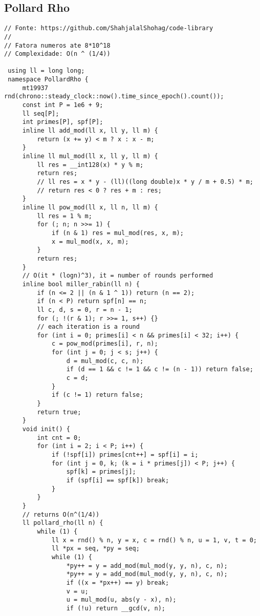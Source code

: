 \documentclass[11pt, a4paper, twoside]{article}
\begin{document}
\subsection{Pollard Rho}
\begin{lstlisting}
// Fonte: https://github.com/ShahjalalShohag/code-library
// 
// Fatora numeros ate 8*10^18 
// Complexidade: O(n ^ (1/4))

 using ll = long long;
 namespace PollardRho {
     mt19937 rnd(chrono::steady_clock::now().time_since_epoch().count());
     const int P = 1e6 + 9;
     ll seq[P];
     int primes[P], spf[P];
     inline ll add_mod(ll x, ll y, ll m) {
         return (x += y) < m ? x : x - m;
     }
     inline ll mul_mod(ll x, ll y, ll m) {
         ll res = __int128(x) * y % m;
         return res;
         // ll res = x * y - (ll)((long double)x * y / m + 0.5) * m;
         // return res < 0 ? res + m : res;
     }
     inline ll pow_mod(ll x, ll n, ll m) {
         ll res = 1 % m;
         for (; n; n >>= 1) {
             if (n & 1) res = mul_mod(res, x, m);
             x = mul_mod(x, x, m);
         }
         return res;
     }
     // O(it * (logn)^3), it = number of rounds performed
     inline bool miller_rabin(ll n) {
         if (n <= 2 || (n & 1 ^ 1)) return (n == 2);
         if (n < P) return spf[n] == n;
         ll c, d, s = 0, r = n - 1;
         for (; !(r & 1); r >>= 1, s++) {}
         // each iteration is a round
         for (int i = 0; primes[i] < n && primes[i] < 32; i++) {
             c = pow_mod(primes[i], r, n);
             for (int j = 0; j < s; j++) {
                 d = mul_mod(c, c, n);
                 if (d == 1 && c != 1 && c != (n - 1)) return false;
                 c = d;
             }
             if (c != 1) return false;
         }
         return true;
     }
     void init() {
         int cnt = 0;
         for (int i = 2; i < P; i++) {
             if (!spf[i]) primes[cnt++] = spf[i] = i;
             for (int j = 0, k; (k = i * primes[j]) < P; j++) {
                 spf[k] = primes[j];
                 if (spf[i] == spf[k]) break;
             }
         }
     }
     // returns O(n^(1/4))
     ll pollard_rho(ll n) {
         while (1) {
             ll x = rnd() % n, y = x, c = rnd() % n, u = 1, v, t = 0;
             ll *px = seq, *py = seq;
             while (1) {
                 *py++ = y = add_mod(mul_mod(y, y, n), c, n);
                 *py++ = y = add_mod(mul_mod(y, y, n), c, n);
                 if ((x = *px++) == y) break;
                 v = u;
                 u = mul_mod(u, abs(y - x), n);
                 if (!u) return __gcd(v, n);

\end{lstlisting}
\end{document}
